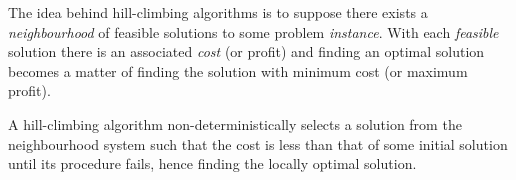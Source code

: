 The idea behind hill-climbing algorithms is to suppose there exists a \emph{neighbourhood} of feasible solutions to some problem \emph{instance}.
With each \emph{feasible} solution there is an associated \emph{cost} (or profit) and finding an optimal solution becomes a matter of finding the solution with minimum cost (or maximum profit).

A hill-climbing algorithm non-deterministically selects a solution from the neighbourhood system such that the cost is less than that of some initial solution until its procedure fails, hence finding the locally optimal solution.

